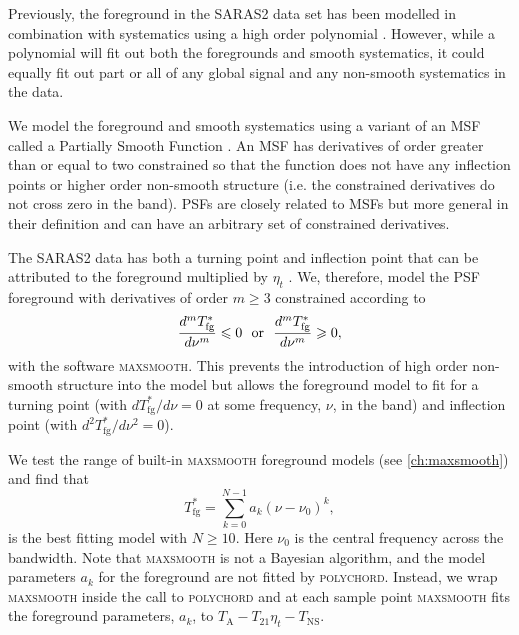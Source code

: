 Previously, the foreground in the SARAS2 data set has been modelled in combination with systematics using a high order polynomial \citep[$N = 4 - 8$, ][]{Singh_saras2_2017, Singh_saras2_2018}. However, while a polynomial will fit out both the foregrounds and smooth systematics, it could equally fit out part or all of any global signal and any non-smooth systematics in the data.

We model the foreground and smooth systematics using a variant of an MSF \citep{Sathyanarayana2015, Sathyanarayana_msf_2017} called a Partially Smooth Function \citep[PSFs,][]{Bevins_maxsmooth_2021}. An MSF has derivatives of order greater than or equal to two constrained so that the function does not have any inflection points or higher order non-smooth structure (i.e. the constrained derivatives do not cross zero in the band). PSFs are closely related to MSFs but more general in their definition and can have an arbitrary set of constrained derivatives.

The SARAS2 data has both a turning point and inflection point that can be attributed to the foreground multiplied by $\eta_t$ \citep[][]{Singh_saras2_2017, Singh_saras2_2018}. We, therefore, model the PSF foreground with derivatives of order $m \geqslant 3$ constrained according to
\begin{equation}
    \frac{d^m T_\mathrm{fg}^*}{d\nu^m} \leqslant 0~~\textnormal{or}~~\frac{d^m T_\mathrm{fg}^*}{d\nu^m} \geqslant 0,
\end{equation}
with the software \textsc{maxsmooth}. This prevents the introduction of high order non-smooth structure into the model but allows the foreground model to fit for a turning point (with $d T_\mathrm{fg}^*/d\nu = 0$ at some frequency, $\nu$, in the band) and inflection point (with $d^2 T_\mathrm{fg}^*/d\nu^2 = 0$).

We test the range of built-in \textsc{maxsmooth} foreground models (see \cref{ch:maxsmooth}) and find that
\begin{equation}
    T_\mathrm{fg}^* = \sum^{N-1}_{k=0} a_k (\nu - \nu_0)^k,
    \label{eq:psf_fore}
\end{equation}
is the best fitting model with $N \geq 10$. Here $\nu_0$ is the central frequency across the bandwidth. Note that \textsc{maxsmooth} is not a Bayesian algorithm, and the model parameters $a_k$ for the foreground are not fitted by \textsc{polychord}. Instead, we wrap \textsc{maxsmooth} inside the call to \textsc{polychord} and at each sample point \textsc{maxsmooth} fits the foreground parameters, $a_k$, to $T_\mathrm{A} - T_{21}\eta_t - T_\mathrm{NS}$.

